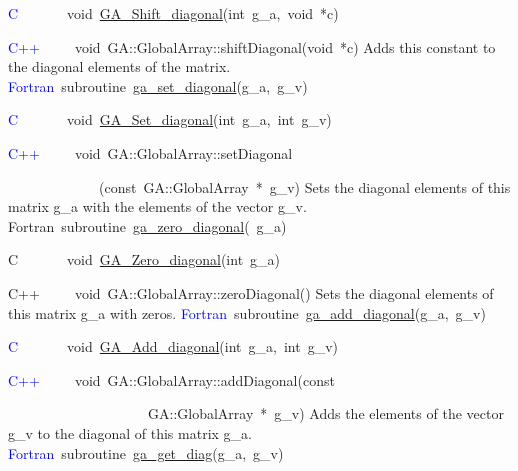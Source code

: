 \textcolor{blue}{C}~~~~~~~void~\href{http://www.emsl.pnl.gov/docs/global/c_nga_ops.html\#ga_shift_diagonal}{GA\_{}Shift\_{}diagonal}(int~g\_a,~void~{*}c)~

\textcolor{blue}{C++}~~~~~void~GA::GlobalArray::shiftDiagonal(void~{*}c)
Adds this constant to the diagonal elements of the matrix.
\textcolor{blue}{Fortran}~subroutine~\href{http://www.emsl.pnl.gov/docs/global/ga_ops.html\#ga_set_diagonal}{ga\_{}set\_{}diagonal}(g\_a,~g\_v)~

\textcolor{blue}{C}~~~~~~~void~\href{http://www.emsl.pnl.gov/docs/global/c_nga_ops.html\#ga_set_diagonal}{GA\_{}Set\_{}diagonal}(int~g\_a,~int~g\_v)

\textcolor{blue}{C++}~~~~~void~GA::GlobalArray::setDiagonal~

~~~~~~~~~~~~~(const~GA::GlobalArray~{*}~g\_v)
Sets the diagonal elements of this matrix g\_a with the elements of
the vector g\_v.
Fortran~subroutine~\href{http://www.emsl.pnl.gov/docs/global/ga_ops.html\#ga_zero_diagonal}{ga\_{}zero\_{}diagonal}(~g\_a)~

C~~~~~~~void~\href{http://www.emsl.pnl.gov/docs/global/c_nga_ops.html\#ga_zero_diagonal}{GA\_{}Zero\_{}diagonal}(int~g\_a)~

C++~~~~~void~GA::GlobalArray::zeroDiagonal()
Sets the diagonal elements of this matrix g\_a with zeros. 
\textcolor{blue}{Fortran}~subroutine~\href{http://www.emsl.pnl.gov/docs/global/ga_ops.html\#ga_add_diagonal}{ga\_{}add\_{}diagonal}(g\_a,~g\_v)~

\textcolor{blue}{C}~~~~~~~void~\href{http://www.emsl.pnl.gov/docs/global/c_nga_ops.html\#ga_add_diagonal}{GA\_{}Add\_{}diagonal}(int~g\_a,~int~g\_v)

\textcolor{blue}{C++}~~~~~void~GA::GlobalArray::addDiagonal(const~

~~~~~~~~~~~~~~~~~~~~GA::GlobalArray~{*}~g\_v)
Adds the elements of the vector g\_v to the diagonal of this matrix
g\_a. 
\textcolor{blue}{Fortran}~subroutine~\href{http://www.emsl.pnl.gov/docs/global/ga_ops.html\#ga_get_diag}{ga\_{}get\_{}diag}(g\_a,~g\_v)~

